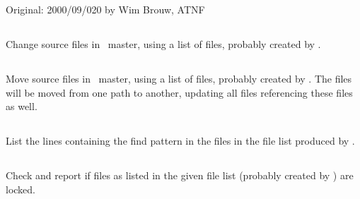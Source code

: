 Original: 2000/09/020 by Wim Brouw, ATNF


\newpage

\subsection{}
\label{UPchange}

Change source files in \aipspp\ master, using a list of files, probably
created by .


\newpage

\subsection{}
\label{UPmove}

Move source files in \aipspp\ master, using a list of files, probably
created by . The files will be moved from one path to another,
updating all files referencing these files as well.


\newpage

\subsection{}
\label{UPlist}

List the lines containing the find pattern in the files in the file list
produced by .


\newpage

\subsection{}
\label{UPlock}

Check and report if files as listed in the given file list (probably created
by ) are locked.

